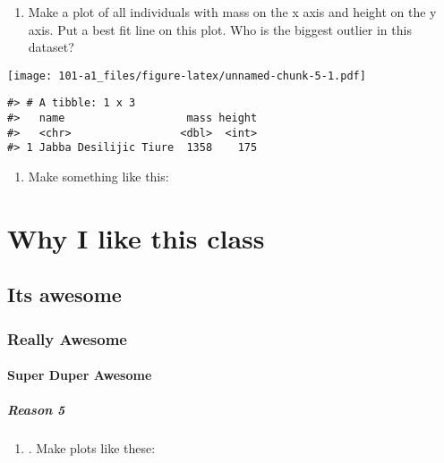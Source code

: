 \documentclass[
]{book}
\providecommand{\tightlist}{%
  \setlength{\itemsep}{0pt}\setlength{\parskip}{0pt}}
\begin{document}
\begin{enumerate}
\def\labelenumi{\arabic{enumi}.}
\setcounter{enumi}{3}
\tightlist
\item
  Make a plot of all individuals with mass on the x axis and height on the y axis. Put a best fit line on this plot. Who is the biggest outlier in this dataset?
\end{enumerate}

\texttt{[image: 101-a1\_files/figure-latex/unnamed-chunk-5-1.pdf]}

\begin{verbatim}
#> # A tibble: 1 x 3
#>   name                   mass height
#>   <chr>                 <dbl>  <int>
#> 1 Jabba Desilijic Tiure  1358    175
\end{verbatim}

\begin{enumerate}
\def\labelenumi{\arabic{enumi}.}
\setcounter{enumi}{4}
\tightlist
\item
  Make something like this:
\end{enumerate}

\hypertarget{why-i-like-this-class}{%
\section{Why I like this class}\label{why-i-like-this-class}}

\hypertarget{its-awesome}{%
\subsection{Its awesome}\label{its-awesome}}

\hypertarget{really-awesome}{%
\subsubsection{Really Awesome}\label{really-awesome}}

\hypertarget{super-duper-awesome}{%
\paragraph{Super Duper Awesome}\label{super-duper-awesome}}

\hypertarget{reason-5}{%
\subparagraph{Reason 5}\label{reason-5}}

\begin{enumerate}
\def\labelenumi{\arabic{enumi}.}
\setcounter{enumi}{5}
\tightlist
\item
  . Make plots like these:
\end{enumerate}
\end{document}
